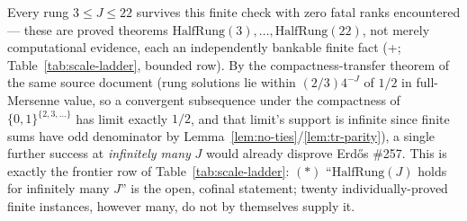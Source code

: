 \begin{rem}
Every rung $3\le J\le22$ survives this finite check with zero fatal ranks encountered — these are
proved theorems $\mathrm{HalfRung}(3),\ldots,\mathrm{HalfRung}(22)$, not merely computational
evidence, each an independently bankable finite fact (+;
Table~\ref{tab:scale-ladder}, bounded row). By the compactness-transfer theorem of the same source
document (rung solutions lie within $(2/3)4^{-J}$ of $1/2$ in full-Mersenne value, so a convergent
subsequence under the compactness of $\{0,1\}^{\{2,3,\ldots\}}$ has limit exactly $1/2$, and that
limit's support is infinite since finite sums have odd denominator by
Lemma~\ref{lem:no-ties}/\ref{lem:tr-parity}), a single further success at \emph{infinitely many} $J$
would already disprove Erdős \#257. This is exactly the frontier row of Table~\ref{tab:scale-ladder}:
$(\ast)$ ``$\mathrm{HalfRung}(J)$ holds for infinitely many $J$'' is the open, cofinal statement;
twenty individually-proved finite instances, however many, do not by themselves supply it.
\end{rem}
